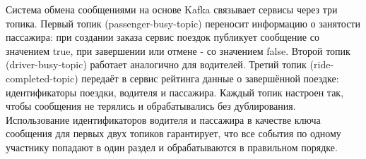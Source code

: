 {\par \redline Система обмена сообщениями на основе Kafka связывает сервисы через три топика. Первый топик (passenger-busy-topic) переносит информацию о занятости пассажира: при создании заказа сервис поездок публикует сообщение со значением true, при завершении или отмене - со значением false. Второй топик (driver-busy-topic) работает аналогично для водителей. Третий топик (ride-completed-topic) передаёт в сервис рейтинга данные о завершённой поездке: идентификаторы поездки, водителя и пассажира. Каждый топик настроен так, чтобы сообщения не терялись и обрабатывались без дублирования. Использование идентификаторов водителя и пассажира в качестве ключа сообщения для первых двух топиков гарантирует, что все события по одному участнику попадают в один раздел и обрабатываются в правильном порядке.
	
	\par
}

\setcounter{subchaptercntr}{1}
\setcounter{formulacntr}{1}
\setcounter{imagecntr}{1}
\setcounter{tablecntr}{1}